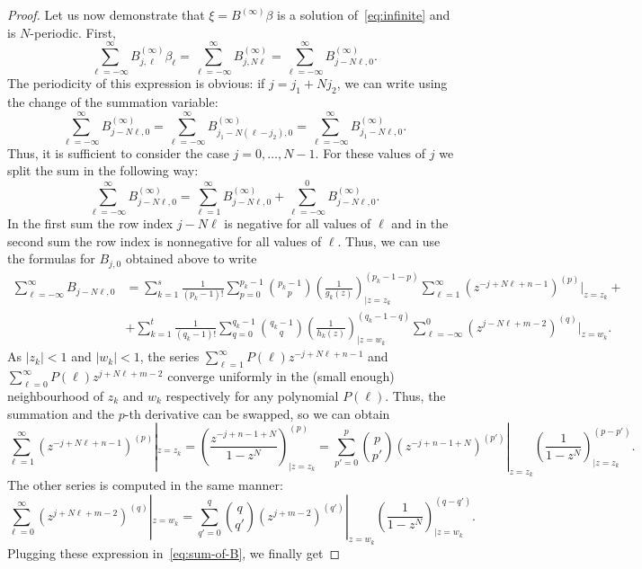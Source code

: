 \documentclass[a4paper]{article}
\newcommand{\Binf}{B^{(\infty)}}
\begin{document}
\begin{proof}
	Let us now demonstrate that $\xi = \Binf\beta$ is a solution of~\eqref{eq:infinite} and is $N$-periodic.
	First,
	\[
	\sum_{\ell=-\infty}^{\infty} \Binf_{j,\ell} \beta_{\ell}
	=
	\sum_{\ell=-\infty}^{\infty}\Binf_{j, N\ell}
	= 
	\sum_{\ell=-\infty}^{\infty}\Binf_{j-N\ell, 0}.
	\]
	The periodicity of this expression is obvious: if $j = j_1 + Nj_2$, we can write using the change of the summation variable:
	\[
	\sum_{\ell=-\infty}^{\infty}\Binf_{j-N\ell, 0}
	=
	\sum_{\ell=-\infty}^{\infty}\Binf_{j_1-N(\ell-j_2), 0}
	=
	\sum_{\ell=-\infty}^{\infty}\Binf_{j_1-N\ell, 0}.
	\]
	Thus, it is sufficient to consider the case $j = 0,\dots, N-1$. 
	For these values of $j$ we split the sum in the following way:
	\[
	\sum_{\ell=-\infty}^{\infty}\Binf_{j-N\ell, 0} 
	=
	\sum_{\ell=1}^{\infty}\Binf_{j-N\ell, 0}
	+
	\sum_{\ell=-\infty}^{0}\Binf_{j-N\ell, 0}.
	\]
	In the first sum the row index $j - N\ell$ is negative for all values of $\ell$ and in the second sum the row index is nonnegative for all values of $\ell$.
	Thus, we can use the formulas for $B_{j,0}$ obtained above to write
	\begin{align}
	\sum_{\ell=-\infty}^{\infty}B_{j-N\ell, 0} 
	&=
	\sum_{k=1}^s\frac{1}{(p_k - 1)!}\sum_{p=0}^{p_k-1}\binom{p_k-1}{p}
	\left(\frac{1}{g_k(z)}\right)^{(p_k-1-p)}_{\big|{z=z_k}}
	\sum_{\ell=1}^{\infty}
	(z^{-j+N\ell+n-1})^{(p)}|_{z=z_k}  \nonumber
		+\\&+
	\sum_{k=1}^t\frac{1}{(q_k - 1)!}\sum_{q=0}^{q_k-1}\binom{q_k-1}{q}
	\left(\frac{1}{h_k(z)}\right)^{(q_k-1-q)}_{\big|{z=w_k}}
	\sum_{\ell=-\infty}^{0}
	(z^{j-N\ell+m-2})^{(q)}|_{z=w_k}. \label{eq:sum-of-B}
	\end{align}
    As $|z_k| < 1$ and $|w_k| < 1$, the series
    $
    \sum_{\ell=1}^{\infty}
	P(\ell)z^{-j+N\ell+n-1}
	$
    and 
    $
    \sum_{\ell=0}^{\infty}
	P(\ell)z^{j+N\ell+m-2}
    $
	converge uniformly in the (small enough) neighbourhood of $z_k$ and $w_k$ respectively for any polynomial $P(\ell)$.
	Thus, the summation and the $p$-th derivative can be swapped, so we can obtain
	\[
	\sum_{\ell=1}^{\infty}
	(z^{-j+N\ell+n-1})^{(p)}|_{z=z_k}
	=
    \left(\frac{z^{-j+n-1+N}}{1-z^{N}}\right)^{(p)}_{\big|{z=z_k}}
    =
	\sum_{p'=0}^p\binom{p}{p'}(z^{-j+n-1+N})^{(p')}|_{z=z_k} \left(\frac{1}{1-z^{N}}\right)^{(p-p')}_{\big|{z=z_k}}.
	\]
	The other series is computed in the same manner:	
	\[
	\sum_{\ell=0}^{\infty}
	(z^{j+N\ell+m-2})^{(q)}|_{z=w_k}
	=
	\sum_{q'=0}^q\binom{q}{q'}(z^{j+m-2})^{(q')}|_{z=w_k} \left(\frac{1}{1-z^{N}}\right)^{(q-q')}_{\big|{z=w_k}}.
	\]
	Plugging these expression in~\eqref{eq:sum-of-B}, we finally get

\end{proof}
\end{document}
